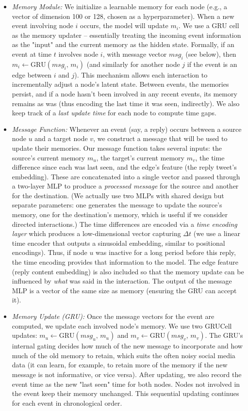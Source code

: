 \documentclass{cshonours}
\begin{document}
\begin{itemize}
\item \emph{Memory Module:} We initialize a learnable memory for each node (e.g., a vector of dimension 100 or 128, chosen as a hyperparameter). When a new event involving node $i$ occurs, the model will update $m_i$. We use a GRU cell as the memory updater – essentially treating the incoming event information as the "input" and the current memory as the hidden state. Formally, if an event at time $t$ involves node $i$, with message vector $msg_i$ (see below), then $m_i \leftarrow \text{GRU}(msg_i,\, m_i)$ (and similarly for another node $j$ if the event is an edge between $i$ and $j$). This mechanism allows each interaction to incrementally adjust a node's latent state. Between events, the memories persist, and if a node hasn't been involved in any recent events, its memory remains as was (thus encoding the last time it was seen, indirectly). We also keep track of a \emph{last update time} for each node to compute time gaps.

\item \emph{Message Function:} Whenever an event (say, a reply) occurs between a source node $u$ and a target node $v$, we construct a message that will be used to update their memories. Our message function takes several inputs: the source's current memory $m_u$, the target's current memory $m_v$, the time difference since each was last seen, and the edge's feature (the reply tweet's embedding). These are concatenated into a single vector and passed through a two-layer MLP to produce a \emph{processed message} for the source and another for the destination. (We actually use two MLPs with shared design but separate parameters: one generates the message to update the source's memory, one for the destination's memory, which is useful if we consider directed interactions.) The time differences are encoded via a \emph{time encoding layer} which produces a low-dimensional vector capturing $\Delta t$ (we use a linear time encoder that outputs a sinusoidal embedding, similar to positional encodings). Thus, if node $u$ was inactive for a long period before this reply, the time encoding provides that information to the model. The edge feature (reply content embedding) is also included so that the memory update can be influenced by \emph{what} was said in the interaction. The output of the message MLP is a vector of the same size as memory (ensuring the GRU can accept it).

\item \emph{Memory Update (GRU):} Once the message vectors for the event are computed, we update each involved node's memory. We use two GRUCell updates: $m_u \leftarrow \text{GRU}(msg_{u},\, m_u)$ and $m_v \leftarrow \text{GRU}(msg_{v},\, m_v)$. The GRU's internal gating decides how much of the new message to incorporate and how much of the old memory to retain, which suits the often noisy social media data (it can learn, for example, to retain more of the memory if the new message is not informative, or vice versa). After updating, we also record the event time as the new "last seen" time for both nodes. Nodes not involved in the event keep their memory unchanged. This sequential updating continues for each event in chronological order.


\end{itemize}
\end{document}
